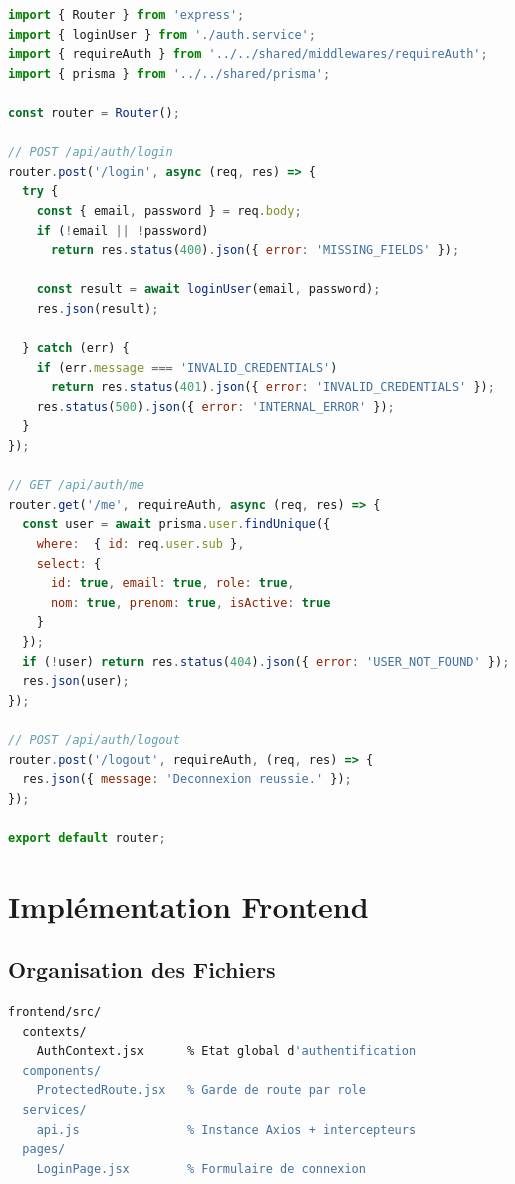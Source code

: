 \documentclass[12pt,a4paper,oneside]{report}
\begin{document}
\begin{lstlisting}[language=JavaScript,
  caption=auth.controller.ts --- Routes login / profil / logout]
import { Router } from 'express';
import { loginUser } from './auth.service';
import { requireAuth } from '../../shared/middlewares/requireAuth';
import { prisma } from '../../shared/prisma';

const router = Router();

// POST /api/auth/login
router.post('/login', async (req, res) => {
  try {
    const { email, password } = req.body;
    if (!email || !password)
      return res.status(400).json({ error: 'MISSING_FIELDS' });

    const result = await loginUser(email, password);
    res.json(result);

  } catch (err) {
    if (err.message === 'INVALID_CREDENTIALS')
      return res.status(401).json({ error: 'INVALID_CREDENTIALS' });
    res.status(500).json({ error: 'INTERNAL_ERROR' });
  }
});

// GET /api/auth/me
router.get('/me', requireAuth, async (req, res) => {
  const user = await prisma.user.findUnique({
    where:  { id: req.user.sub },
    select: {
      id: true, email: true, role: true,
      nom: true, prenom: true, isActive: true
    }
  });
  if (!user) return res.status(404).json({ error: 'USER_NOT_FOUND' });
  res.json(user);
});

// POST /api/auth/logout
router.post('/logout', requireAuth, (req, res) => {
  res.json({ message: 'Deconnexion reussie.' });
});

export default router;
\end{lstlisting}

\section{Implémentation Frontend}

\subsection{Organisation des Fichiers}

\begin{lstlisting}[language=bash,
  caption=Structure frontend --- Module Authentification et Roles]
frontend/src/
  contexts/
    AuthContext.jsx      % Etat global d'authentification
  components/
    ProtectedRoute.jsx   % Garde de route par role
  services/
    api.js               % Instance Axios + intercepteurs
  pages/
    LoginPage.jsx        % Formulaire de connexion
\end{lstlisting}
\end{document}
